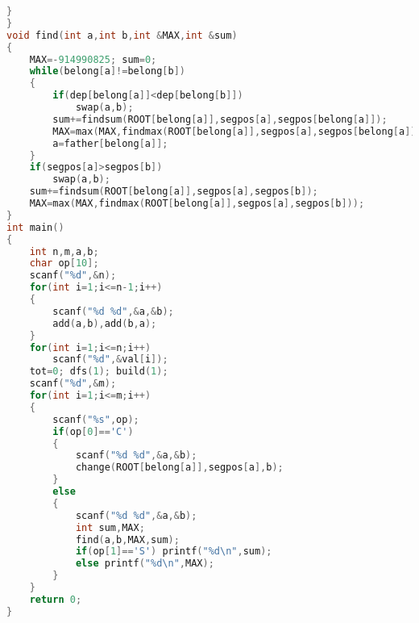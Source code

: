 \begin{lstlisting}[language=c++]
	}
}
void find(int a,int b,int &MAX,int &sum)
{
	MAX=-914990825; sum=0;
	while(belong[a]!=belong[b])
	{
		if(dep[belong[a]]<dep[belong[b]])
			swap(a,b);
		sum+=findsum(ROOT[belong[a]],segpos[a],segpos[belong[a]]);
		MAX=max(MAX,findmax(ROOT[belong[a]],segpos[a],segpos[belong[a]]));
		a=father[belong[a]];
	}
	if(segpos[a]>segpos[b])
		swap(a,b);
	sum+=findsum(ROOT[belong[a]],segpos[a],segpos[b]);
	MAX=max(MAX,findmax(ROOT[belong[a]],segpos[a],segpos[b]));
}
int main()
{
	int n,m,a,b;
	char op[10];
	scanf("%d",&n);
	for(int i=1;i<=n-1;i++)
	{
		scanf("%d %d",&a,&b);
		add(a,b),add(b,a);	
	}
	for(int i=1;i<=n;i++)
		scanf("%d",&val[i]);
	tot=0; dfs(1); build(1);
	scanf("%d",&m);
	for(int i=1;i<=m;i++)
	{
		scanf("%s",op);
		if(op[0]=='C') 
		{
			scanf("%d %d",&a,&b);
			change(ROOT[belong[a]],segpos[a],b);	
		}	
		else
		{
			scanf("%d %d",&a,&b);
			int sum,MAX;
			find(a,b,MAX,sum);
			if(op[1]=='S') printf("%d\n",sum);
			else printf("%d\n",MAX);
		}
	}
	return 0;
}
    \end{lstlisting}

